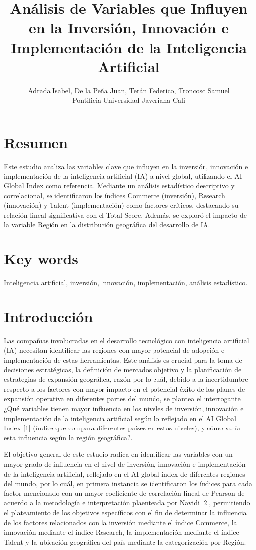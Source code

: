 \documentclass[
]{article}
\title{Análisis de Variables que Influyen en la Inversión, Innovación e
Implementación de la Inteligencia Artificial}
\author{Adrada Isabel, De la Peña Juan, Terán Federico, Troncoso
Samuel\\
Pontificia Universidad Javeriana Cali}
\date{}
\begin{document}
\maketitle

\begin{multicols}{2}

\section{Resumen}
Este estudio analiza las variables clave que influyen en la inversión, innovación e implementación de la inteligencia artificial (IA) a nivel global, utilizando el AI Global Index como referencia. Mediante un análisis estadístico descriptivo y correlacional, se identificaron los índices Commerce (inversión), Research (innovación) y Talent (implementación) como factores críticos, destacando su relación lineal significativa con el Total Score. Además, se exploró el impacto de la variable Región en la distribución geográfica del desarrollo de IA.

\section{Key words}
Inteligencia artificial, inversión, innovación, implementación, análisis estadístico.

\section{Introducción}
Las compañıas involucradas en el desarrollo tecnológico con inteligencia artificial (IA) necesitan identificar las regiones con mayor potencial de adopción e implementación de estas herramientas. Este análisis es crucial para la toma de decisiones estratégicas, la definición de mercados objetivo y la planificación de estrategias de expansión geográfica, razón por lo cuál, debido a la incertidumbre respecto a los factores con mayor impacto en el potencial éxito de los planes de expansión operativa en diferentes partes del mundo, se plantea el interrogante ¿Qué variables tienen mayor influencia en los niveles de inversión, innovación e implementación de la inteligencia artificial según lo reflejado en el AI Global Index [1] (índice que compara diferentes países en estos niveles), y cómo varía esta influencia según la región geográfica?.

El objetivo general de este estudio radica en identificar las variables con un mayor grado de influencia en el nivel de inversión, innovación e implementación de la inteligencia artificial, reflejado en el AI global index de diferentes regiones del mundo, por lo cuál, en primera instancia se identificaron los índices para cada factor mencionado con un mayor coeficiente de correlación lineal de Pearson de acuerdo a la metodología e interpretación plaenteada por Navidi [2], permitiendo el plateamiento de los objetivos específicos con el fin de determinar la influencia de los factores relacionados con la inversión mediante el índice Commerce, la innovación mediante el índice Research, la implementación mediante el índice Talent y la ubicación geográfica del país mediante la categorización por Región.


\end{multicols}
\end{document}
